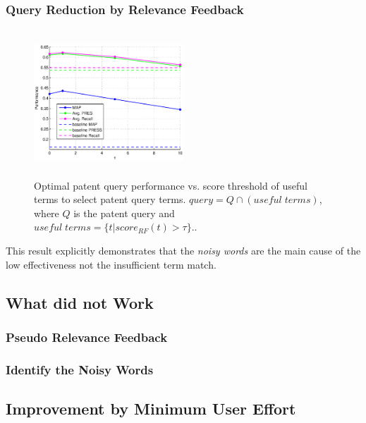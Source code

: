 \documentclass{sig-alternate}
\begin{document}
\subsubsection{Query Reduction by Relevance Feedback}
\begin{figure}[htpb]
   \centering
   \includegraphics[width=0.50\textwidth,height=55mm]{figs/opt-patentquery-tau.eps}
   \caption{Optimal patent query performance vs. score threshold of useful terms to select patent query terms. $ query = Q\cap (useful \; terms) $, where $ Q $ is the patent query and $ useful\; terms = \{t| score_{RF}(t)>\tau\} $..}   
   \label{fig:optpatentquery} 
\end{figure}
This result explicitly demonstrates that the {\em noisy words} are the main cause of  the low effectiveness not the insufficient term match. 

\subsection{What did not Work}

\subsubsection{Pseudo Relevance Feedback}

\subsubsection{Identify the Noisy Words}

\subsection{Improvement by Minimum User Effort}
\end{document}
